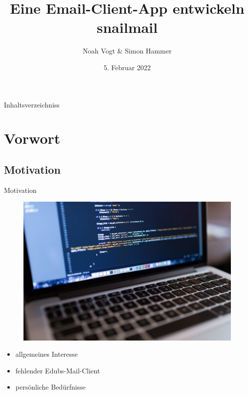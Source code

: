 \documentclass[aspectratio=169]{beamer}
\title{
    Eine Email-Client-App entwickeln\\
    \vspace{.1cm}
    \normalsize snailmail
}
\author{Noah Vogt \& Simon Hammer}
\date{5. Februar 2022}
\institute{Gymnasium Kirschgarten}
\begin{document}
\begin{frame}[plain]

\maketitle

\end{frame}

\begin{frame}[plain]{Inhaltsverzeichniss}
        \tableofcontents
\end{frame}

\section{Vorwort}
\subsection{Motivation}
\begin{frame}[plain]{Motivation}
\begin{varwidth}{.5\textwidth}
        \begin{figure}
            \centering
            \includegraphics[width=.9\textwidth]{media/macbook.jpg}
        \end{figure}
    \end{varwidth}
    \hfill
    \begin{varwidth}{.5\textwidth}
        \begin{itemize}\pause
            \item allgemeines Interesse\pause
            \item fehlender Edubs-Mail-Client\pause
            \item persönliche Bedürfnisse
        \end{itemize}
    \end{varwidth} 
\end{frame}
\end{document}
